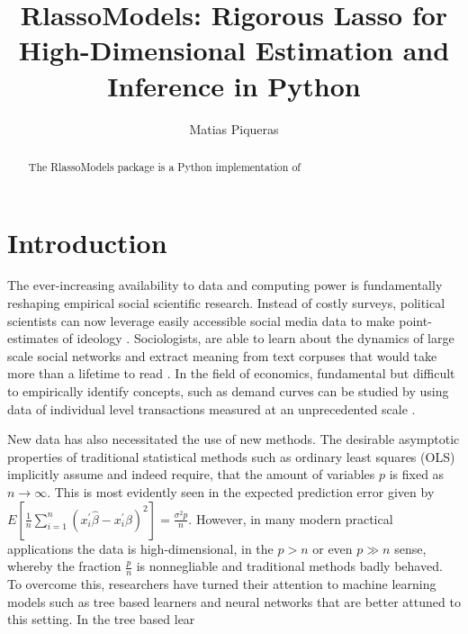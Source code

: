 \documentclass[11pt, reqno]{amsart} \usepackage{pstricks} %
\newenvironment{nouppercase}{%
  \let\uppercase\relax%
  \renewcommand{\uppercasenonmath}[1]{}}{}
\newcommand{\pkg}[1]{{\fontseries{m}\fontseries{b}\selectfont #1}}
\let\proglang=\textsf
\begin{document}
\title[Title]{\large
\pkg{RlassoModels}: Rigorous Lasso for High-Dimensional Estimation and Inference in \proglang{Python}}
\author{Matias Piqueras}


\begin{nouppercase}
\maketitle
\end{nouppercase}

\begin{abstract}
The \pkg{RlassoModels} package is a \proglang{Python} implementation of  
\end{abstract}


\section{Introduction}
\label{sec:intro}

The ever-increasing availability to data and computing power is fundamentally
reshaping empirical social scientific research. Instead of costly surveys,
political scientists can now leverage easily accessible social media data to
make point-estimates of ideology \citep{Barbera2015}. Sociologists, are able to
learn about the dynamics of large scale social networks and extract meaning
from text corpuses that would take more than a lifetime to read
\citep{Sapiezynski2019, Kozlowski2019}. In the field of economics, fundamental
but difficult to empirically identify concepts, such as demand curves can be
studied by using data of individual level transactions measured at an
unprecedented scale \citep{Cohen2016}. 

New data has also necessitated the use of new methods. The desirable asymptotic
properties of traditional statistical methods such as ordinary least squares
(OLS) implicitly assume and indeed require, that the amount of variables $p$ is
fixed as $n \to \infty$. This is most evidently seen in the expected prediction
error given by $E\left[\frac{1}{n} \sum_{i=1}^{n}\left(x_{i}^{\prime}
\hat{\beta}-x_{i}^{\prime} \beta\right)^{2}\right]=\frac{\sigma^{2} p}{n}$.
However, in many modern practical applications the data is high-dimensional, in
the $p>n$ or even $p \gg n$ sense, whereby the fraction $\frac{p}{n}$ is
nonnegliable and traditional methods badly behaved. To overcome this,
researchers have turned their attention to machine learning models such as tree
based learners and neural networks that are better attuned to this setting. In
\citep{Breiman2001} the tree based lear
\end{document}
